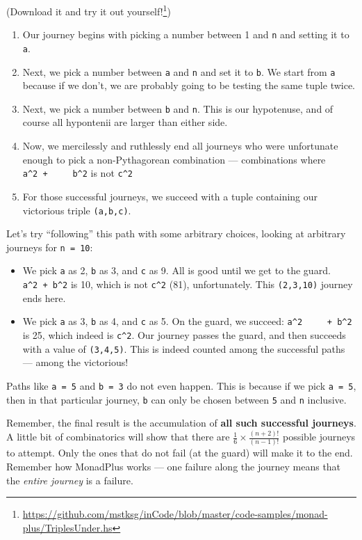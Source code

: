 \documentclass[]{article}
\renewcommand{\href}[2]{#2\footnote{\url{#1}}}
\begin{document}
(\href{https://github.com/mstksg/inCode/blob/master/code-samples/monad-plus/TriplesUnder.hs}{Download
it and try it out yourself!})

\begin{enumerate}
\def\labelenumi{\arabic{enumi}.}
\tightlist
\item
  Our journey begins with picking a number between 1 and \texttt{n} and setting
  it to \texttt{a}.
\item
  Next, we pick a number between \texttt{a} and \texttt{n} and set it to
  \texttt{b}. We start from \texttt{a} because if we don't, we are probably
  going to be testing the same tuple twice.
\item
  Next, we pick a number between \texttt{b} and \texttt{n}. This is our
  hypotenuse, and of course all hypontenii are larger than either side.
\item
  Now, we mercilessly and ruthlessly end all journeys who were unfortunate
  enough to pick a non-Pythagorean combination --- combinations where
  \texttt{a\^{}2\ +\ \ \ \ \ b\^{}2} is not \texttt{c\^{}2}
\item
  For those successful journeys, we succeed with a tuple containing our
  victorious triple \texttt{(a,b,c)}.
\end{enumerate}

Let's try ``following'' this path with some arbitrary choices, looking at
arbitrary journeys for \texttt{n\ =\ 10}:

\begin{itemize}
\tightlist
\item
  We pick \texttt{a} as 2, \texttt{b} as 3, and \texttt{c} as 9. All is good
  until we get to the guard. \texttt{a\^{}2\ +\ b\^{}2} is 10, which is not
  \texttt{c\^{}2} (81), unfortunately. This \texttt{(2,3,10)} journey ends here.
\item
  We pick \texttt{a} as 3, \texttt{b} as 4, and \texttt{c} as 5. On the guard,
  we succeed: \texttt{a\^{}2\ \ \ \ \ +\ b\^{}2} is 25, which indeed is
  \texttt{c\^{}2}. Our journey passes the guard, and then succeeds with a value
  of \texttt{(3,4,5)}. This is indeed counted among the successful paths ---
  among the victorious!
\end{itemize}

Paths like \texttt{a\ =\ 5} and \texttt{b\ =\ 3} do not even happen. This is
because if we pick \texttt{a\ =\ 5}, then in that particular journey, \texttt{b}
can only be chosen between \texttt{5} and \texttt{n} inclusive.

Remember, the final result is the accumulation of \textbf{all such successful
journeys}. A little bit of combinatorics will show that there are
\(\frac{1}{6} \times \frac{(n+2)!}{(n-1)!}\) possible journeys to attempt. Only
the ones that do not fail (at the guard) will make it to the end. Remember how
MonadPlus works --- one failure along the journey means that the \emph{entire
journey} is a failure.
\end{document}
